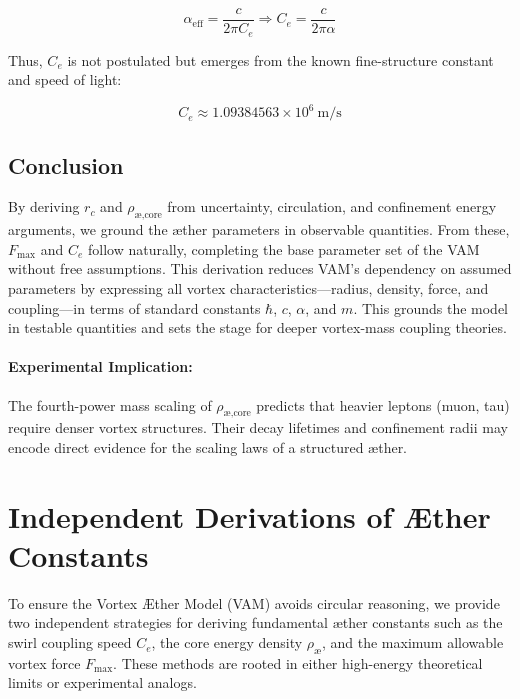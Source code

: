 \begin{equation}
\alpha_\text{eff} = \frac{c}{2\pi C_e} \Rightarrow C_e = \frac{c}{2\pi \alpha}
\end{equation}

Thus, $C_e$ is not postulated but emerges from the known fine-structure constant and speed of light:

\begin{equation}
C_e \approx 1.09384563 \times 10^6 \ \text{m/s}
\end{equation}


\subsection{Conclusion}

By deriving $r_c$ and $\rho_{\text{\ae,core}}$ from uncertainty, circulation, and confinement energy arguments, we ground the \ae{}ther parameters in observable quantities. From these, $F_{\max}$ and $C_e$ follow naturally, completing the base parameter set of the VAM without free assumptions. This derivation reduces VAM's dependency on assumed parameters by expressing all vortex characteristics—radius, density, force, and coupling—in terms of standard constants \(\hbar\), \(c\), \(\alpha\), and \(m\). This grounds the model in testable quantities and sets the stage for deeper vortex-mass coupling theories.

\paragraph{Experimental Implication:} The fourth-power mass scaling of $\rho_{\text{\ae,core}}$ predicts that heavier leptons (muon, tau) require denser vortex structures. Their decay lifetimes and confinement radii may encode direct evidence for the scaling laws of a structured \ae{}ther.




\section{Independent Derivations of Æther Constants}

To ensure the Vortex Æther Model (VAM) avoids circular reasoning, we provide two independent strategies for deriving fundamental æther constants such as the swirl coupling speed $C_e$, the core energy density $\rho_{\text{æ}}$, and the maximum allowable vortex force $F_{\max}$. These methods are rooted in either high-energy theoretical limits or experimental analogs.

